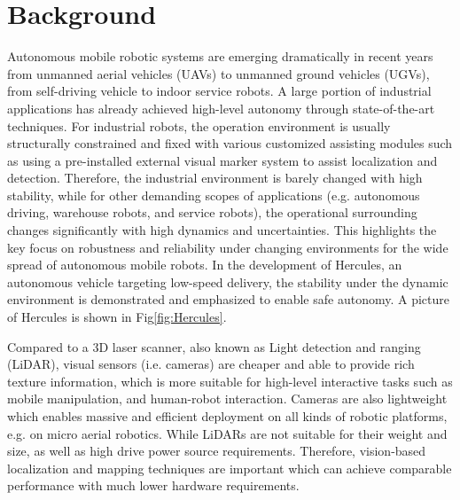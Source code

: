\section{Background}
Autonomous mobile robotic systems are emerging dramatically in recent years from
unmanned aerial vehicles (UAVs) to unmanned ground vehicles (UGVs), from self-driving
vehicle to indoor service robots. A large portion of industrial applications has
already achieved high-level autonomy through state-of-the-art techniques. 
For industrial robots, the operation environment is usually structurally constrained and fixed with various customized assisting modules such as using a pre-installed external visual marker system to assist localization and detection. 
Therefore, the industrial environment is barely changed with high stability, 
while for other demanding scopes of applications (e.g. autonomous driving, warehouse robots, and service robots), the operational surrounding changes significantly with high dynamics and uncertainties. This highlights the key focus on robustness and reliability under changing environments for the wide spread of autonomous mobile robots. In the development of Hercules\cite{liuhercules}, an autonomous vehicle targeting low-speed delivery, the stability under the dynamic environment is demonstrated and emphasized to enable safe autonomy. A picture of Hercules is shown in Fig\ref{fig:Hercules}.

Compared to a 3D laser scanner, also known as Light detection and ranging (LiDAR), 
visual sensors (i.e. cameras) are cheaper and able to provide rich
texture information, which is more suitable for high-level interactive tasks such
as mobile manipulation, and human-robot interaction. Cameras are also lightweight which enables massive and efficient deployment on all kinds of robotic platforms, e.g. on micro aerial robotics. While LiDARs are not suitable for their weight and size, as well as high drive power source requirements. Therefore, vision-based localization and mapping techniques are important which can achieve comparable performance with much lower hardware requirements.

